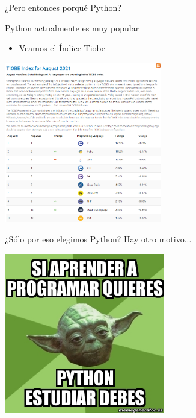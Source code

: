 \documentclass{beamer}
\begin{document}
\begin{frame}{¿Pero entonces porqué Python?} \pause
\begin{block}{Python actualmente es muy popular}  \pause
	\begin{itemize}
		\item Veamos el \textcolor{blue}{\href{https://www.tiobe.com/tiobe-index/}{Índice Tiobe}}
	\end{itemize}
\end{block}
\begin{center}
\includegraphics[height=7cm, scale=0.5]{tiobeIndex.png}
\end{center}
\end{frame}

\begin{frame}{¿Sólo por eso elegimos Python?} \pause
Hay otro motivo... \pause
\begin{center}
\includegraphics[height=7cm, scale=0.5]{yoda.png}
\end{center}
\end{frame}
\end{document}
